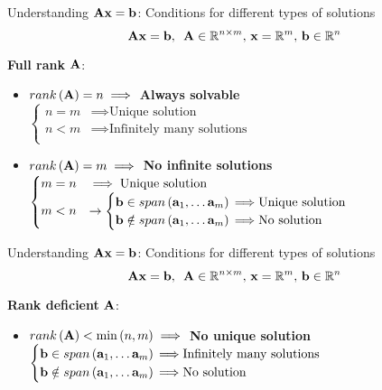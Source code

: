 \documentclass[aspectratio=169]{beamer}
\let\olditem\item
\renewcommand{\item}{\setlength{\itemsep}{\fill}\olditem}
\def\mf{\ensuremath\mathbf}
\def\mb{\ensuremath\mathbb}
\def\lp{\ensuremath\left(}
\def\rp{\ensuremath\right)}
\begin{document}
\begin{frame}[t]{Understanding $\mf{A}\mf{x} = \mf{b}$: Conditions for different types of solutions}
\[ \mf{A}\mf{x} = \mf{b}, \,\,\, \mf{A} \in \mb{R}^{n \times m}, \, \mf{x} = \mb{R}^m, \, \mf{b} \in \mb{R}^n \]

\textbf{Full rank } $\mf{A}$:
\begin{itemize}
  \item $rank\lp \mf{A} \rp = n \implies$ \textbf{Always solvable}\\
        \vspace{0.2cm}
        $\begin{cases} 
        n = m & \implies \text{Unique solution} \\ 
        n < m & \implies \text{Infinitely many solutions} \\ 
        \end{cases}$
  \item $rank\lp \mf{A} \rp = m  \implies$ \textbf{No infinite solutions}\\
        \vspace{0.2cm}
        $\begin{cases} 
        m = n & \implies \text{Unique solution} \\ 
        m < n & \rightarrow \begin{cases}
        \mf{b} \in span\lp \mf{a}_1, \ldots \mf{a}_m \rp {\implies} \text{Unique solution} \\
        \mf{b} \notin span\lp \mf{a}_1, \ldots \mf{a}_m \rp {\implies} \text{No solution}
        \end{cases}\\ 
        \end{cases}$
\end{itemize}
\end{frame}


\begin{frame}[t]{Understanding $\mf{A}\mf{x} = \mf{b}$: Conditions for different types of solutions}
\[ \mf{A}\mf{x} = \mf{b}, \,\,\, \mf{A} \in \mb{R}^{n \times m}, \, \mf{x} = \mb{R}^m, \, \mf{b} \in \mb{R}^n \]

\textbf{Rank deficient} $\mf{A}$:
\begin{itemize}
  \item $rank\lp \mf{A} \rp < \min \lp n, m \rp \implies$ \textbf{No unique solution}\\
        \vspace{0.2cm}
        $\begin{cases}
        \mf{b} \in span\lp \mf{a}_1, \ldots \mf{a}_m \rp {\implies} \text{Infinitely many solutions} \\
        \mf{b} \notin span\lp \mf{a}_1, \ldots \mf{a}_m \rp {\implies} \text{No solution}
        \end{cases}$
\end{itemize}
\end{frame}
\end{document}
